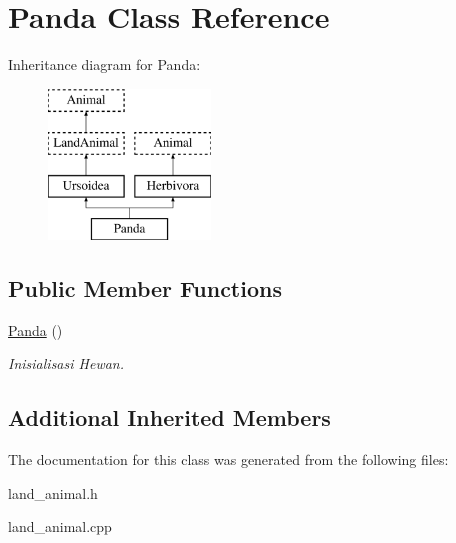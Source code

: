\hypertarget{class_panda}{}\section{Panda Class Reference}
\label{class_panda}
Inheritance diagram for Panda\+:\begin{figure}[H]
\begin{center}
\leavevmode
\includegraphics[height=4.000000cm]{class_panda}
\end{center}
\end{figure}
\subsection*{Public Member Functions}
\begin{DoxyCompactItemize}
\item 
\hyperlink{class_panda_a489fdb1f4fe88f0c0c99a3f0768212b4}{Panda} ()\hypertarget{class_panda_a489fdb1f4fe88f0c0c99a3f0768212b4}{}\label{class_panda_a489fdb1f4fe88f0c0c99a3f0768212b4}

\begin{DoxyCompactList}\small\item\em Inisialisasi Hewan. \end{DoxyCompactList}\end{DoxyCompactItemize}
\subsection*{Additional Inherited Members}


The documentation for this class was generated from the following files\+:\begin{DoxyCompactItemize}
\item 
land\+\_\+animal.\+h\item 
land\+\_\+animal.\+cpp\end{DoxyCompactItemize}
